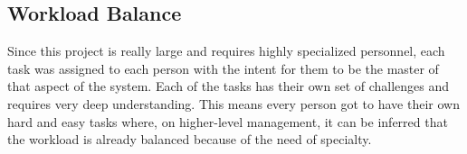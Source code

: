 \subsection{Workload Balance}
\label{subsec:workload-balance}
    Since this project is really large and requires highly specialized personnel, each task was assigned
    to each person with the intent for them to be the master of that aspect of the system.
    Each of the tasks has their own set of challenges and requires very deep understanding.
    This means every person got to have their own hard and easy tasks where, on higher-level management,
    it can be inferred that the workload is already balanced because of the need of specialty.